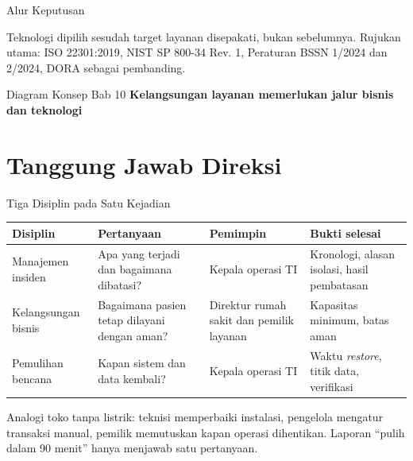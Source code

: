 \documentclass[aspectratio=169, table, 12pt]{beamer}
\begin{document}
\begin{frame}{{\Large Alur Keputusan}}
  \vspace{20pt}
  \begin{center}
    \resizebox{0.95\textwidth}{!}{}
  \end{center}
  \vspace{10pt}
  \small Teknologi dipilih sesudah target layanan disepakati, bukan sebelumnya. Rujukan utama: ISO
  22301:2019, NIST SP 800-34 Rev. 1, Peraturan BSSN 1/2024 dan 2/2024, DORA sebagai pembanding.
\end{frame}

\begin{frame}{{\Large Diagram Konsep Bab 10}}
  \centering
  {\small\bfseries Kelangsungan layanan memerlukan jalur bisnis dan teknologi}\par\medskip
  \label{fig:session10-ilustrasi-bab}
\end{frame}

\section{Tanggung Jawab Direksi}

\begin{frame}{{\Large Tiga Disiplin pada Satu Kejadian}}
  \vspace{4pt}
  \footnotesize
  \begin{tabularx}{\textwidth}{|>{\raggedright\arraybackslash}p{}|>{\raggedright\arraybackslash}X|>{\raggedright\arraybackslash}p{}|>{\raggedright\arraybackslash}X|}
    \hline
    \textbf{Disiplin} & \textbf{Pertanyaan} & \textbf{Pemimpin} & \textbf{Bukti selesai} \\ \hline
    Manajemen insiden & Apa yang terjadi dan bagaimana dibatasi? & Kepala operasi TI & Kronologi,
    alasan isolasi, hasil pembatasan \\ \hline
    Kelangsungan bisnis & Bagaimana pasien tetap dilayani dengan aman? & Direktur rumah sakit dan
    pemilik layanan & Kapasitas minimum, batas aman \\ \hline
    Pemulihan bencana & Kapan sistem dan data kembali? & Kepala operasi TI & Waktu
    \textit{restore}, titik data, verifikasi \\ \hline
  \end{tabularx}

  \vspace{8pt}
  \small Analogi toko tanpa listrik: teknisi memperbaiki instalasi, pengelola mengatur transaksi
  manual, pemilik memutuskan kapan operasi dihentikan. Laporan ``pulih dalam 90 menit'' hanya
  menjawab satu pertanyaan.
\end{frame}
\end{document}
